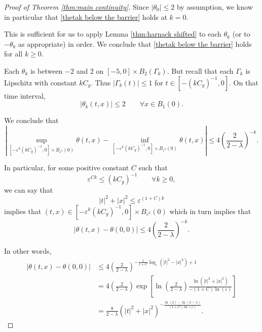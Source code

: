 \documentclass[11pt]{amsart}
\theoremstyle{remark}
\theoremstyle{definition}
\newcommand{\eps}{\varepsilon}
\newcommand{\paren}[1]{\left( #1 \right)}
\newcommand{\bracket}[1]{\left[ #1 \right]}
\newcommand{\abs}[1]{\left\lvert #1 \right\rvert}
\newcommand{\n}{^{-1}}
\newcommand{\Cgamma}{C_g}
\begin{document}
\begin{proof}[Proof of Theorem \ref{thm:main continuity}]
Since $|\theta_0|\leq 2$ by assumption, we know in particular that \eqref{thetak below the barrier} holds at $k=0$.  

This is sufficient for us to apply Lemma \ref{thm:harnack shifted} to each $\theta_k$ (or to $-\theta_k$ as appropriate) in order.  We conclude that \eqref{thetak below the barrier} holds for all $k \geq 0$.  

Each $\theta_k$ is between $-2$ and 2 on $[-5,0]\times B_2(\Gamma_k)$.  But recall that each $\Gamma_k$ is Lipschitz with constant $k \Cgamma$.  Thus $|\Gamma_k(t)|\leq 1$ for $t \in [-(k \Cgamma)\n, 0]$.  On that time interval, 
\[ \abs{\theta_k(t,x)} \leq 2 \qquad \forall x \in B_1(0). \]

We conclude that
\[ \abs{ \sup_{[-\eps^k (k \Cgamma)\n, 0] \times B_{\eps^k}(0)} \theta(t,x) - \inf_{[-\eps^k (k \Cgamma)\n, 0] \times B_{\eps^k}(0)} \theta(t,x) } \leq 4 \paren{\frac{2}{2-\lambda}}^{-k}. \]

In particular, for some positive constant $C$ such that
\[ \eps^{C k} \leq (k \Cgamma)\n \qquad \forall k \geq 0, \]
we can say that
\[ |t|^2 + |x|^2 \leq \eps^{(1+C)k} \]	
implies that $(t,x) \in [-\eps^k (k \Cgamma)\n, 0] \times B_{\eps^k}(0)$ which in turn implies that
\[ \abs{\theta(t,x) - \theta(0,0)} \leq  4 \paren{\frac{2}{2-\lambda}}^{-k}. \]

In other words,
\begin{align*} 
\abs{\theta(t,x) - \theta(0,0)} &\leq 4 \paren{\frac{2}{2-\lambda}}^{ -\frac{1}{1+C} \log_\eps(|t|^2 - |x|^2)  + 1} 
\\ &= 4 \paren{\frac{2}{2-\lambda}} \exp\bracket{\ln\paren{\frac{2}{2-\lambda}} \frac{\ln(|t|^2 + |x|^2)}{-(1+C)\ln(\eps)}}
\\ &= \frac{8}{2-\lambda} (|t|^2 + |x|^2)^{-\frac{\ln(2) - \ln(2-\lambda)}{(1+C)\ln(\eps)}}.
\end{align*}

\end{proof}




\end{document}
